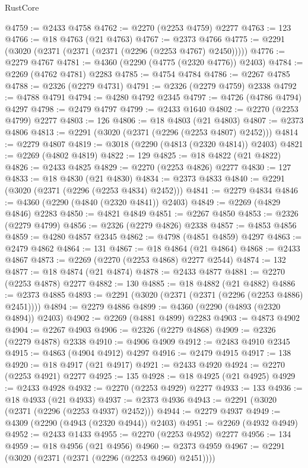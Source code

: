 \begin{lexlean}{RustCore}
\begin{coremodule}
@4759 := @2433 @4758
@4762 := @2270 (@2253 @4759) @2277
@4763 := 123
@4766 := @18 @4763 (@21 @4763)
@4767 := @2373 @4766
@4775 := @2291 (@3020 (@2371 (@2371 (@2371 (@2296 (@2253 @4767) @2450)))))
@4776 := @2279 @4767
@4781 := @4360 (@2290 (@4775 (@2320 @4776)) @2403)
@4784 := @2269 (@4762 @4781) @2283
@4785 := @4754 @4784
@4786 := @2267 @4785
@4788 := @2326 (@2279 @4731)
@4791 := @2326 (@2279 @4759) @2338
@4792 := @4788 @4791
@4794 := @4280 @4792 @2345
@4797 := @4726 (@4786 @4794) @4297
@4798 := @2479 @4797
@4799 := @2433 @1640
@4802 := @2270 (@2253 @4799) @2277
@4803 := 126
@4806 := @18 @4803 (@21 @4803)
@4807 := @2373 @4806
@4813 := @2291 (@3020 (@2371 (@2296 (@2253 @4807) @2452)))
@4814 := @2279 @4807
@4819 := @3018 (@2290 (@4813 (@2320 @4814)) @2403)
@4821 := @2269 (@4802 @4819)
@4822 := 129
@4825 := @18 @4822 (@21 @4822)
@4826 := @2433 @4825
@4829 := @2270 (@2253 @4826) @2277
@4830 := 127
@4833 := @18 @4830 (@21 @4830)
@4834 := @2373 @4833
@4840 := @2291 (@3020 (@2371 (@2296 (@2253 @4834) @2452)))
@4841 := @2279 @4834
@4846 := @4360 (@2290 (@4840 (@2320 @4841)) @2403)
@4849 := @2269 (@4829 @4846) @2283
@4850 := @4821 @4849
@4851 := @2267 @4850
@4853 := @2326 (@2279 @4799)
@4856 := @2326 (@2279 @4826) @2338
@4857 := @4853 @4856
@4859 := @4280 @4857 @2345
@4862 := @4798 (@4851 @4859) @4297
@4863 := @2479 @4862
@4864 := 131
@4867 := @18 @4864 (@21 @4864)
@4868 := @2433 @4867
@4873 := @2269 (@2270 (@2253 @4868) @2277 @2544)
@4874 := 132
@4877 := @18 @4874 (@21 @4874)
@4878 := @2433 @4877
@4881 := @2270 (@2253 @4878) @2277
@4882 := 130
@4885 := @18 @4882 (@21 @4882)
@4886 := @2373 @4885
@4893 := @2291 (@3020 (@2371 (@2371 (@2296 (@2253 @4886) @2451))))
@4894 := @2279 @4886
@4899 := @4360 (@2290 (@4893 (@2320 @4894)) @2403)
@4902 := @2269 (@4881 @4899) @2283
@4903 := @4873 @4902
@4904 := @2267 @4903
@4906 := @2326 (@2279 @4868)
@4909 := @2326 (@2279 @4878) @2338
@4910 := @4906 @4909
@4912 := @2483 @4910 @2345
@4915 := @4863 (@4904 @4912) @4297
@4916 := @2479 @4915
@4917 := 138
@4920 := @18 @4917 (@21 @4917)
@4921 := @2433 @4920
@4924 := @2270 (@2253 @4921) @2277
@4925 := 135
@4928 := @18 @4925 (@21 @4925)
@4929 := @2433 @4928
@4932 := @2270 (@2253 @4929) @2277
@4933 := 133
@4936 := @18 @4933 (@21 @4933)
@4937 := @2373 @4936
@4943 := @2291 (@3020 (@2371 (@2296 (@2253 @4937) @2452)))
@4944 := @2279 @4937
@4949 := @4309 (@2290 (@4943 (@2320 @4944)) @2403)
@4951 := @2269 (@4932 @4949)
@4952 := @2433 @1433
@4955 := @2270 (@2253 @4952) @2277
@4956 := 134
@4959 := @18 @4956 (@21 @4956)
@4960 := @2373 @4959
@4967 := @2291 (@3020 (@2371 (@2371 (@2296 (@2253 @4960) @2451))))

\end{coremodule}
\end{lexlean}
